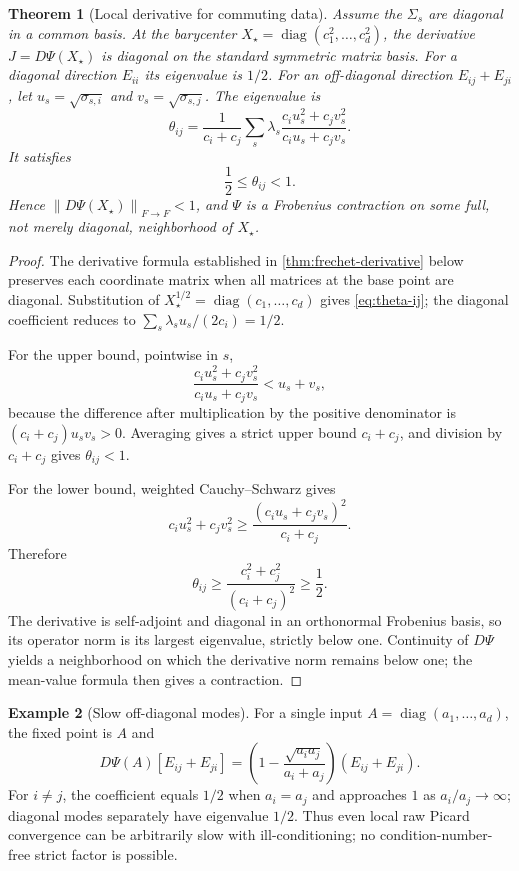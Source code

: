 \documentclass[11pt]{article}
\newtheorem{theorem}{Theorem}[section]
\theoremstyle{definition}
\newtheorem{example}[theorem]{Example}
\newcommand{\diag}{\operatorname{diag}}
\newcommand{\norm}[1]{\left\lVert #1\right\rVert}
\begin{document}
\begin{theorem}[Local derivative for commuting data]\label{thm:commuting-local}
Assume the $\Sigma_s$ are diagonal in a common basis.  At the barycenter
$X_\star=\diag(c_1^2,\ldots,c_d^2)$, the derivative
$J=D\Psi(X_\star)$ is diagonal on the standard symmetric matrix basis.
For a diagonal direction $E_{ii}$ its eigenvalue is $1/2$.  For an off-diagonal
direction $E_{ij}+E_{ji}$, let
$u_s=\sqrt{\sigma_{s,i}}$ and $v_s=\sqrt{\sigma_{s,j}}$.  The eigenvalue is
\begin{equation}\label{eq:theta-ij}
 \theta_{ij}=
 \frac{1}{c_i+c_j}\sum_s\lambda_s
 \frac{c_i u_s^2+c_jv_s^2}{c_iu_s+c_jv_s}.
\end{equation}
It satisfies
\begin{equation}\label{eq:theta-bounds}
 \frac12\leq\theta_{ij}<1.
\end{equation}
Hence $\norm{D\Psi(X_\star)}_{F\to F}<1$, and $\Psi$ is a Frobenius
contraction on some full, not merely diagonal, neighborhood of $X_\star$.
\end{theorem}

\begin{proof}
The derivative formula established in \cref{thm:frechet-derivative} below
preserves each coordinate matrix when all matrices at the base point are
diagonal.  Substitution of
$X_\star^{1/2}=\diag(c_1,\ldots,c_d)$ gives
\eqref{eq:theta-ij}; the diagonal coefficient reduces to
$\sum_s\lambda_su_s/(2c_i)=1/2$.

For the upper bound, pointwise in $s$,
\[
 \frac{c_i u_s^2+c_jv_s^2}{c_iu_s+c_jv_s}
 <u_s+v_s,
\]
because the difference after multiplication by the positive denominator is
$(c_i+c_j)u_sv_s>0$.  Averaging gives a strict upper bound $c_i+c_j$, and
division by $c_i+c_j$ gives $\theta_{ij}<1$.

For the lower bound, weighted Cauchy--Schwarz gives
\[
 c_i u_s^2+c_jv_s^2\geq
 \frac{(c_iu_s+c_jv_s)^2}{c_i+c_j}.
\]
Therefore
\[
 \theta_{ij}\geq
 \frac{c_i^2+c_j^2}{(c_i+c_j)^2}\geq\frac12.
\]
The derivative is self-adjoint and diagonal in an orthonormal Frobenius basis,
so its operator norm is its largest eigenvalue, strictly below one.  Continuity
of $D\Psi$ yields a neighborhood on which the derivative norm remains below
one; the mean-value formula then gives a contraction.
\end{proof}

\begin{example}[Slow off-diagonal modes]
For a single input $A=\diag(a_1,\ldots,a_d)$, the fixed point is $A$ and
\begin{equation}\label{eq:single-input-theta}
 D\Psi(A)[E_{ij}+E_{ji}]
 =\left(1-\frac{\sqrt{a_ia_j}}{a_i+a_j}\right)(E_{ij}+E_{ji}).
\end{equation}
For $i\neq j$, the coefficient equals $1/2$ when $a_i=a_j$ and approaches
$1$ as $a_i/a_j\to\infty$; diagonal modes separately have eigenvalue $1/2$.
Thus even local raw Picard convergence can be arbitrarily
slow with ill-conditioning; no condition-number-free strict factor is
possible.
\end{example}
\end{document}
